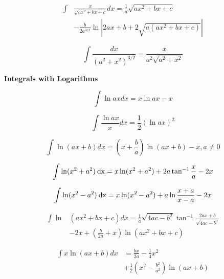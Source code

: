 \documentclass[11pt,twoside]{article}
\begin{document}
\begin{multicols}{3}
\begin{footnotesize}
\begin{align}
\int &\frac{x}{\sqrt{ax^2+bx+c}}dx=
\frac{1}{a}\sqrt{ax^2+bx + c} \nonumber \\&
-
\frac{b}{2a^{3/2}}\ln \left| 2ax+b + 2 \sqrt{a(ax^2+bx+c)} \right |
\end{align}

\begin{equation}
\int\frac{dx}{(a^2+x^2)^{3/2}}=\frac{x}{a^2\sqrt{a^2+x^2}}
\end{equation}

\columnbreak

\begin{center} \textbf{Integrals with Logarithms} \end{center}

\begin{equation}
\int \ln ax dx = x \ln ax - x
\end{equation}

\begin{equation}
\int \frac{\ln ax}{x} dx = \frac{1}{2}\left ( \ln ax \right)^2
\end{equation}

\begin{equation}
\int \ln (ax + b) dx = \left ( x + \frac{b}{a} \right) \ln (ax+b) - x , a\ne 0
\end{equation}

\begin{align}
\int \ln  ( x^2 + a^2 )\hspace{.5ex}\text{dx} = x \ln (x^2 + a^2  ) +2a\tan^{-1} \frac{x}{a} - 2x
\end{align}

\begin{align}
\int \ln  ( x^2 - a^2 )\hspace{.5ex}\text{dx} = x \ln (x^2 - a^2  ) +a\ln \frac{x+a}{x-a} - 2x \end{align}

\begin{align}
\int \ln & \left ( ax^2 + bx + c\right) dx  = \frac{1}{a}\sqrt{4ac-b^2}\tan^{-1}\frac{2ax+b}{\sqrt{4ac-b^2}}
\nonumber \\ & -2x
 + \left( \frac{b}{2a}+x \right )\ln \left (ax^2+bx+c \right)
\end{align}

\begin{align}
\int x \ln (ax + b) dx &= \frac{bx}{2a}-\frac{1}{4}x^2 \nonumber
\\&
+\frac{1}{2}\left(x^2-\frac{b^2}{a^2}\right)\ln (ax+b)
\end{align}


\end{footnotesize}
\end{multicols}
\end{document}

